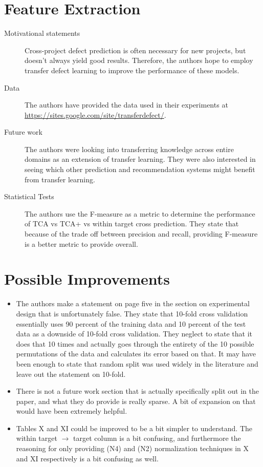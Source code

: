 \documentclass[english]{article}
\begin{document}
\section*{Feature Extraction}
\begin{description}
\item[{Motivational statements}] Cross-project defect prediction is often necessary for new projects, but doesn't always yield good results. Therefore, the authors hope to employ transfer defect learning to improve the performance of these models.
\item[{Data}] The authors have provided the data used in their experiments at\\
 \href{https://sites.google.com/site/transferdefect/}{https://sites.google.com/site/transferdefect/}.
\item[{Future work}] The authors were looking into transferring knowledge across entire domains as an extension of transfer learning. They were also interested in seeing which other prediction and recommendation systems might benefit from transfer learning.
\item[{Statistical Tests}] The authors use the F-measure as a metric to determine the performance of TCA vs TCA+ vs within target cross prediction.  They state that because of the trade off between precision and recall, providing F-measure is a better metric to provide overall.
\end{description}

\section*{Possible Improvements}
\begin{itemize}
\item The authors make a statement on page five in the section on experimental design that is unfortunately false.  They state that 10-fold cross validation essentially uses 90 percent of the training data and 10 percent of the test data as a downside of 10-fold cross validation.  They neglect to state that it does that 10 times and actually goes through the entirety of the 10 possible permutations of the data and calculates its error based on that.  It may have been enough to state that random split was used widely in the literature and leave out the statement on 10-fold.

\item There is not a future work section that is actually specifically split out in the paper, and what they do provide is really sparse.  A bit of expansion on that would have been extremely helpful.

\item Tables X and XI could be improved to be a bit simpler to understand.  The within target $\rightarrow$ target column is a bit confusing, and furthermore the reasoning for only providing (N4) and (N2) normalization techniques in X and XI respectively is a bit confusing as well.

\end{itemize}
\end{document}
